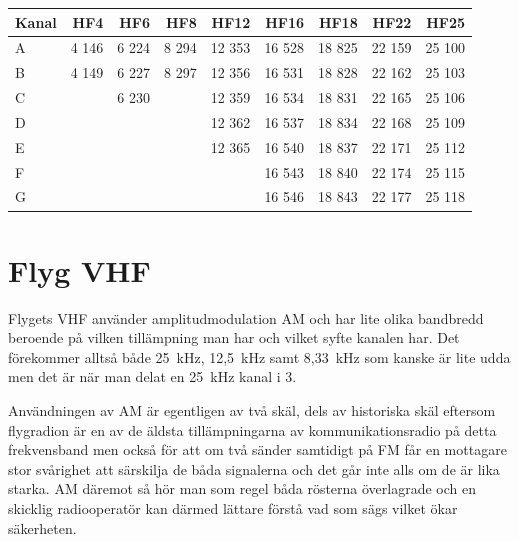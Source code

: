 \begin{longtable}{lrrrrrrrr}
\textbf{Kanal} & \textbf{HF4} & \textbf{HF6} & \textbf{HF8} &
               \textbf{HF12} & \textbf{HF16} & \textbf{HF18} &
               \textbf{HF22} & \textbf{HF25} \\
\hline
\endhead

A & 4 146 & 6 224 & 8 294 & 12 353 & 16 528 & 18 825 & 22 159 & 25 100 \\
B & 4 149 & 6 227 & 8 297 & 12 356 & 16 531 & 18 828 & 22 162 & 25 103 \\
C &       & 6 230 &       & 12 359 & 16 534 & 18 831 & 22 165 & 25 106 \\
D &       &       &       & 12 362 & 16 537 & 18 834 & 22 168 & 25 109 \\
E &       &       &       & 12 365 & 16 540 & 18 837 & 22 171 & 25 112 \\
F &       &       &       &        & 16 543 & 18 840 & 22 174 & 25 115 \\
G &       &       &       &        & 16 546 & 18 843 & 22 177 & 25 118 \\
\end{longtable}



\newpage

\section{Flyg VHF}

Flygets VHF använder amplitudmodulation AM och har lite olika
bandbredd beroende på vilken tillämpning man har och vilket syfte
kanalen har. Det förekommer alltså både 25~kHz, 12,5~kHz samt 8,33~kHz
som kanske är lite udda men det är när man delat en 25~kHz kanal i 3.

Användningen av AM är egentligen av två skäl, dels av historiska skäl
eftersom flygradion är en av de äldsta tillämpningarna av
kommunikationsradio på detta frekvensband men också för att om två
sänder samtidigt på FM får en mottagare stor svårighet att särskilja
de båda signalerna och det går inte alls om de är lika starka. AM
däremot så hör man som regel båda rösterna överlagrade och en skicklig
radiooperatör kan därmed lättare förstå vad som sägs vilket ökar
säkerheten.

